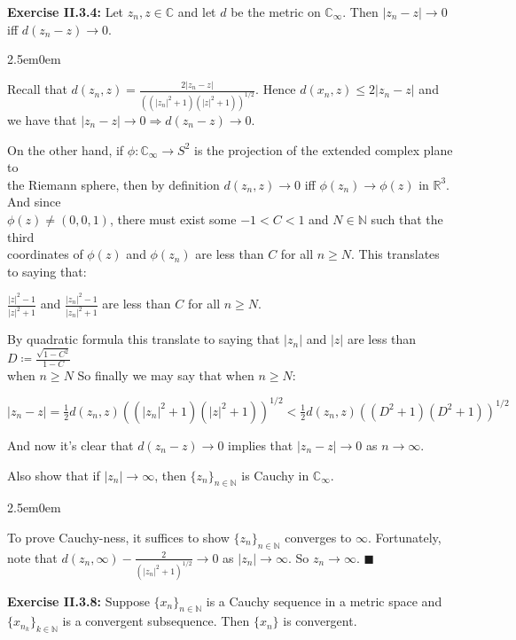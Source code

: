 \documentclass{book}
\newcommand{\Hstatement}{%
   \color{MidnightBlue!90!Black}%
   \fontsize{12}{13}\selectfont%
}
\newcommand{\HexOne}{%
   \color{Purple}%
   \fontsize{12}{13}\selectfont%
}
\newenvironment{myIndent}{%
   \begin{adjustwidth}{2.5em}{0em}%
}{%
   \end{adjustwidth}%
}
\newcommand{\blab}[1]{\textbf{#1}}
\newcommand{\retTwo}{\hfill\bigbreak}
\begin{document}
\Hstatement\blab{Exercise II.3.4:} Let $z_n, z \in \mathbb{C}$ and let $d$ be the metric on $\mathbb{C}_\infty$. Then $|z_n - z| \to 0$ iff $d(z_n - z) \to 0$.

\begin{myIndent}\HexOne
	Recall that $d(z_n, z) = \frac{2|z_n - z|}{((|z_n|^2 + 1)(|z|^2 + 1))^{1/2}}$. Hence $d(x_n, z) \leq 2|z_n - z|$ and we have that $|z_n - z| \to 0 \Longrightarrow d(z_n - z) \to 0$.\retTwo
	
	On the other hand, if $\phi : \mathbb{C}_\infty \to S^2$ is the projection of the extended complex plane to\\ [1pt] the Riemann sphere, then by definition $d(z_n, z) \to 0$ iff $\phi(z_n) \to \phi(z)$ in $\mathbb{R}^3$. And since\\ [1pt] $\phi(z) \neq (0, 0, 1)$, there must exist some $-1 < C < 1$ and $N \in \mathbb{N}$ such that the third\\ [1pt] coordinates  of $\phi(z)$ and $\phi(z_n)$ are less than $C$ for all $n \geq N$. This translates to saying that:
	
	{\centering$\frac{|z|^2 - 1}{|z|^2 + 1}$ and $\frac{|z_n|^2 - 1}{|z_n|^2 + 1}$ are less than $C$ for all $n \geq N$.\retTwo\par}

	By quadratic formula this translate to saying that $|z_n|$ and $|z|$ are less than $D \coloneqq \frac{\sqrt{1 - C^2}}{1 - C}$\\ [-2pt] when $n \geq N$ So finally we may say that when $n \geq N$:

	{\center $|z_n - z| = \frac{1}{2}d(z_n, z)((|z_n|^2 + 1)(|z|^2 + 1))^{1/2} < \frac{1}{2}d(z_n, z)((D^2 + 1)(D^2 + 1))^{1/2}$ \retTwo\par}

	And now it's clear that $d(z_n - z) \to 0$ implies that $|z_n - z| \to 0$ as $n \to \infty$.\retTwo
\end{myIndent}

Also show that if $|z_n| \to \infty$, then $\{z_n\}_{n \in \mathbb{N}}$ is Cauchy in $\mathbb{C}_\infty$. 

\begin{myIndent}\HexOne
	To prove Cauchy-ness, it suffices to show $\{z_n\}_{n \in \mathbb{N}}$ converges to $\infty$. Fortunately, note that $d(z_n, \infty) - \frac{2}{(|z_n|^2 + 1)^{1/2}} \to 0$ as $|z_n| \to \infty$. So $z_n \to \infty$. $\blacksquare$\retTwo
\end{myIndent}

\blab{Exercise II.3.8:} Suppose $\{x_n\}_{n \in \mathbb{N}}$ is a Cauchy sequence in a metric space and $\{x_{n_k}\}_{k \in \mathbb{N}}$ is a convergent subsequence. Then $\{x_n\}$ is convergent.
\end{document}
